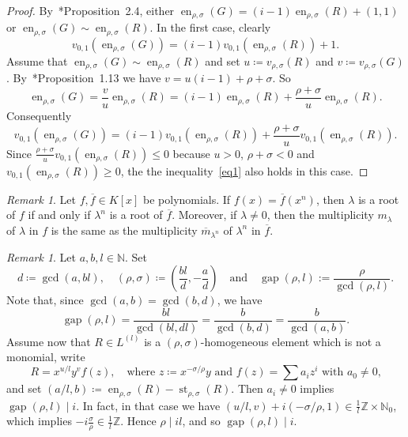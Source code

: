 \documentclass[reqno,a4paper]{amsart}
\theoremstyle{definition}
\theoremstyle{remark}
\newtheorem{remark}[theorem]{Remark}
\DeclareMathOperator{\en}{en}
\DeclareMathOperator{\st}{st}
\DeclareMathOperator{\gap}{gap}
\newcommand{\ov}{\overline}
\begin{document}
\begin{proof} By~\cite{GGV}*{Proposition~2.4}, either $\en_{\rho,\sigma}(G)=(i-1) \en_{\rho,\sigma}(R)+(1,1)$ or $\en_{\rho,\sigma}(G) \sim \en_{\rho,\sigma}(R)$. In the first case, clearly
\begin{equation*}
v_{0,1}(\en_{\rho,\sigma}(G))= (i-1)v_{0,1}(\en_{\rho,\sigma}(R))+1.
\end{equation*}
Assume that $\en_{\rho,\sigma}(G)\sim \en_{\rho,\sigma}(R)$ and set $u\coloneqq v_{\rho,\sigma}(R)$ and $v\coloneqq v_{\rho,\sigma}(G)$. By~\cite{GGV}*{Proposition~1.13} we have $v=u(i-1)+\rho+\sigma$. So
$$
\en_{\rho,\sigma}(G)=\frac{v}{u} \en_{\rho,\sigma}(R)= (i-1)\en_{\rho,\sigma}(R)+\frac{\rho+\sigma}{u} \en_{\rho,\sigma}(R).
$$
Consequently
$$
v_{0,1}(\en_{\rho,\sigma}(G))= (i-1)v_{0,1}(\en_{\rho,\sigma}(R))+\frac{\rho+\sigma}{u}v_{0,1}(\en_{\rho,\sigma}(R)).
$$
Since $\frac{\rho+\sigma}{u}v_{0,1}(\en_{\rho,\sigma}(R)) \le 0$ because $u>0$, $\rho+\sigma<0$ and $v_{0,1}(\en_{\rho,\sigma}(R))\ge 0$, the the inequality~\eqref{eq1} also holds in this case.
\end{proof}

\begin{remark}\label{multiplicidad de la potencia} Let $f,\ov f\in K[x]$ be polynomials.
If $f(x)=\ov f(x^n)$, then $\lambda$ is a root of $f$ if and only if $\lambda^n$ is a root of
$\ov f$. Moreover, if $\lambda\ne 0$, then the multiplicity $m_\lambda$ of $\lambda$ in $f$ is the same as the
multiplicity $\ov m_{\lambda^n}$ of $\lambda^n$ in $\ov f$.
\end{remark}

\begin{remark}\label{gap}
Let $a,b,l\in\mathds{N}$. Set
$$
d\coloneqq\gcd(a,bl),\quad (\rho,\sigma)\coloneqq \left(\frac{bl}{d},-\frac{a}{d}\right)\quad\text{and}\quad \gap(\rho,l):=\frac{\rho}{\gcd(\rho,l)}.
$$
Note that, since $\gcd(a,b)=\gcd(b,d)$, we have
\begin{equation}\label{otra formula para gap}
\gap(\rho,l) = \frac{bl}{\gcd(bl,dl)} = \frac{b}{\gcd(b,d)} = \frac{b}{\gcd(a,b)}.
\end{equation}
Assume now that $R\in L^{(l)}$ is a $(\rho,\sigma)$-homogeneous element which is not a monomial, write
$$
R=x^{u/l}y^v f(z),\quad\text{where $z\coloneqq x^{-\sigma/\rho}y$ and $f(z) = \sum a_i z^i$ with $a_0\ne 0$,}
$$
and set $(a/l,b) \coloneqq \en_{\rho,\sigma}(R)-\st_{\rho,\sigma}(R)$. Then $a_i\ne 0$ implies $\gap(\rho,l)\mid i$. In fact, in that case we have $(u/l,v)+i(-\sigma/\rho,1)\in \frac 1l\mathds{Z}\times \mathds{N}_0$, which implies $-i\frac{\sigma}{\rho}\in\frac 1l \mathds{Z}$. Hence $\rho\mid il$, and so $\gap(\rho,l)\mid i$.
\end{remark}
\end{document}
